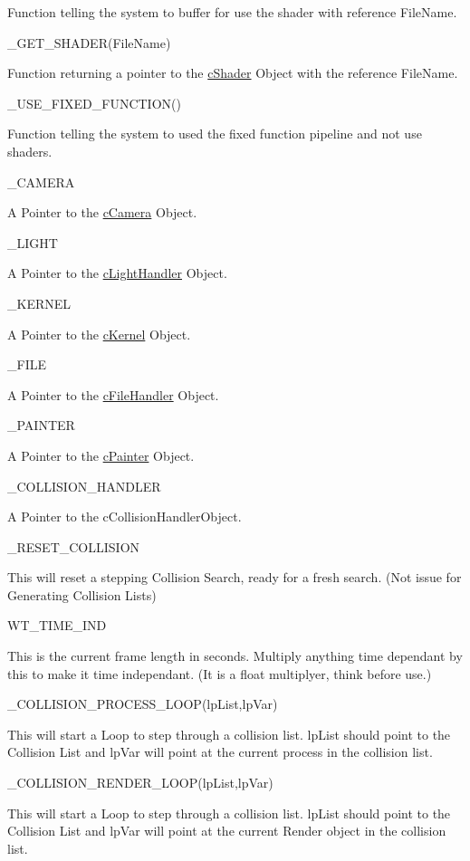 \begin{DoxyItemize}
\item Function telling the system to buffer for use the shader with reference FileName.\par
 \_\-GET\_\-SHADER(FileName)
\item Function returning a pointer to the \hyperlink{classc_shader}{cShader} Object with the reference FileName.\par
 \_\-USE\_\-FIXED\_\-FUNCTION()
\item Function telling the system to used the fixed function pipeline and not use shaders.\par
 \_\-CAMERA
\item A Pointer to the \hyperlink{classc_camera}{cCamera} Object.\par
 \_\-LIGHT
\item A Pointer to the \hyperlink{classc_light_handler}{cLightHandler} Object.\par
 \_\-KERNEL
\item A Pointer to the \hyperlink{classc_kernel}{cKernel} Object.\par
 \_\-FILE
\item A Pointer to the \hyperlink{classc_file_handler}{cFileHandler} Object.\par
 \_\-PAINTER
\item A Pointer to the \hyperlink{classc_painter}{cPainter} Object.\par
 \_\-COLLISION\_\-HANDLER
\item A Pointer to the cCollisionHandlerObject.\par
 \_\-RESET\_\-COLLISION
\item This will reset a stepping Collision Search, ready for a fresh search. (Not issue for Generating Collision Lists)\par
 WT\_\-TIME\_\-IND
\item This is the current frame length in seconds. Multiply anything time dependant by this to make it time independant. (It is a float multiplyer, think before use.)\par
 \_\-COLLISION\_\-PROCESS\_\-LOOP(lpList,lpVar)
\item This will start a Loop to step through a collision list. lpList should point to the Collision List and lpVar will point at the current process in the collision list.\par
 \_\-COLLISION\_\-RENDER\_\-LOOP(lpList,lpVar)
\item This will start a Loop to step through a collision list. lpList should point to the Collision List and lpVar will point at the current Render object in the collision list.\par
 
\end{DoxyItemize}